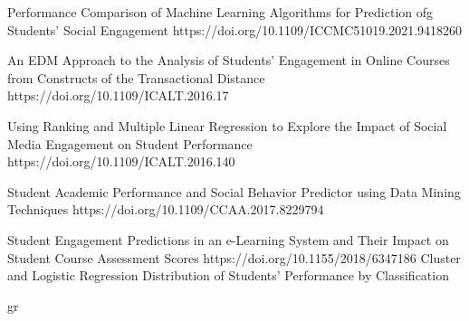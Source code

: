 \documentclass[12pt]{article}
\begin{document}
\newpage
\renewcommand{\thepage}{}
\begin{center}

\end{center}
     \begin{thebibliography}{99}
 Performance Comparison of Machine Learning Algorithms for Prediction ofg Students’ 
Social Engagement https://doi.org/10.1109/ICCMC51019.2021.9418260

An EDM Approach to the Analysis of Students' Engagement in Online Courses from 
Constructs of the Transactional Distance https://doi.org/10.1109/ICALT.2016.17

Using Ranking and Multiple Linear Regression to Explore the Impact of Social Media 
Engagement on Student Performance https://doi.org/10.1109/ICALT.2016.140

Student Academic Performance and Social Behavior Predictor using Data Mining Techniques 
https://doi.org/10.1109/CCAA.2017.8229794

 Student Engagement Predictions in an e-Learning System and Their Impact on Student 
Course Assessment Scores https://doi.org/10.1155/2018/6347186
 Cluster and Logistic Regression Distribution of Students’ Performance by Classification 


\end{thebibliography} gr
\end{document}
